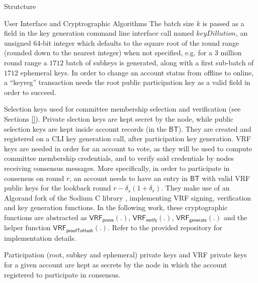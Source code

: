 \documentclass[10pt,a4paper]{article}
\begin{document}
\begin{section}{Strutcture}
\begin{subsection}{User Interface and Cryptrographic Algorithms}
    The batch size $k$ is passed as a field in the key generation command line interface call named 
    $keyDillution$, an unsigned 64-bit integer which defaults to the square root of the round range 
    (rounded down to the nearest integer) when not specified, e.g. for a 3 million round range a $1712$ 
    batch of subkeys is generated,  along with a first sub-batch of $1712$ ephemeral keys.
    In order to change an account status from offline to online, a ``keyreg'' transaction needs the 
    root public participation key as a valid field in order to succeed.


    Selection keys used for committee membership selection and verification (see Sections \ref{}).
    Private slection keys are kept secret by the node, while public selection keys are kept inside 
    account records (in the $\mathsf{BT}$).
    They are created and registered on a CLI key generation call, after participation key generation.
    VRF keys are needed in order for an account to vote, as they will be
    used to compute committee membership credentials, and to verify said credentials by nodes receiving consensus messages.
    More specifically, in order to participate in consensus on round $r$, an account needs to have an entry in $\mathsf{BT}$
    with valid VRF public keys for the lookback round $r-\delta_s(1+\delta_r)$.
    They make use of an Algorand fork of the Sodium C library , implementing VRF signing, verification and
    key generation functions.
    In the following work, these cryptographic functions are abstracted as $\mathsf{VRF_{prove}}(.)$, $\mathsf{VRF_{verify}}(.)$, $\mathsf{VRF_{generate}}(.)$
    and the helper function $\mathsf{VRF_{proofToHash}}(.)$.
    Refer to the provided repository for implementation details.

    Participation (root, subkey and ephemeral) private keys and VRF private keys for a given account are kept as secrets by the node
    in which the account registered to participate in consensus.



\end{subsection}
\end{section}
\end{document}
